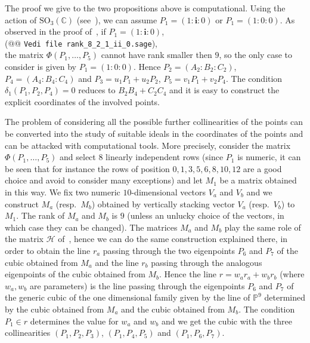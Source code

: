 \documentclass{amsart}
\theoremstyle{plain}
\theoremstyle{definition}
\newcommand{\iii}{\textbf{i}}
\begin{document}
The proof we give to the two propositions above is computational.
Using the action of $\mathrm{SO}_3(\mathbb{C})$ (see~),
we can assume $P_1= (1: \iii: 0)$ or $P_1= (1: 0: 0)$. As observed
in the proof of~, if $P_1 = (1: \iii: 0)$,\\
(@@ \verb+Vedi file rank_8_2_1_ii_0.sage+), \\
the matrix
$\Phi(P_1, \dots, P_5)$ cannot have rank smaller then $9$, so the only
case to consider is given by $P_1 = (1: 0: 0)$. Hence
$P_2 = (A_2: B_2: C_2)$, $P_4 = (A_4: B_4: C_4)$ and
$P_3 = u_1P_1+u_2P_2$, $P_5=v_1P_1+v_2P_4$.
The condition $\delta_1(P_1, P_2, P_4)=0$ reduces to $B_2B_4+C_2C_4$
and it is easy to construct the explicit coordinates of the involved points.

The problem of considering all the possible further
collinearities of the points can be converted into the study of suitable
ideals in the coordinates of the points and can be attacked with
computational tools. More precisely,
consider the matrix $\Phi(P_1, \dots, P_5)$ and select $8$ linearly independent
rows (since $P_1$ is numeric, it can be seen that for instance the rows
of position $0, 1, 3, 5, 6, 8, 10, 12$ are a good choice and avoid to consider
many exceptions) and let $M_1$ be a matrix obtained in this way.
We fix two numeric $10$-dimensional vectors $V_a$ and $V_b$ and we construct
$M_a$ (resp.\ $M_b$) obtained by vertically stacking vector $V_a$ (resp.\ $V_b$)
to $M_1$. The rank of $M_a$ and $M_b$ is $9$ (unless an unlucky choice
of the vectors, in which case they can be changed). The matrices $M_a$ and
$M_b$ play the same role of the matrix $\mathcal{H}$
of~, hence we can do the same construction explained
there, in order to obtain the line $r_a$ passing through the two
eigenpoints $P_6$ and $P_7$ of the cubic obtained from $M_a$ and the
line $r_b$ passing through the analogous eigenpoints of the cubic
obtained from $M_b$.
Hence the line $r = w_ar_a+w_br_b$
(where $w_a, w_b$ are parameters) is the line passing through the eigenpoints
$P_6$ and $P_7$
of the generic cubic of the one dimensional family given by the line
of $\mathbb{P}^9$ determined by the cubic obtained from $M_a$ and
the cubic obtained from $M_b$. The condition $P_1 \in r$ 
determines the value for $w_a$ and $w_b$ and we get the cubic
with the three collinearities $(P_1, P_2, P_3)$,
$(P_1, P_4, P_5)$ and $(P_1, P_6, P_7)$.

\end{document}
